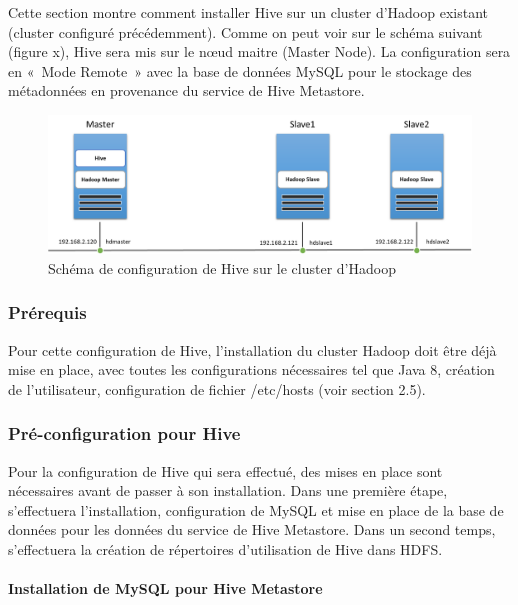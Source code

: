 \documentclass[12pt,french]{book}
\begin{document}
Cette section montre comment installer Hive sur un cluster d’Hadoop existant (cluster configuré précédemment). Comme on peut voir sur le schéma suivant (figure x), Hive sera mis sur le nœud maitre (Master Node). La configuration sera en « Mode Remote » avec la base de données MySQL pour le stockage des métadonnées en provenance du service de Hive Metastore.

\begin{figure}[H]
	\centering
	\includegraphics[width=\linewidth]{hiveCluster}
	\caption{Schéma de configuration de Hive sur le cluster d'Hadoop}
\end{figure}

\subsubsection{Prérequis}

Pour cette configuration de Hive, l’installation du cluster Hadoop doit être déjà mise en place, avec toutes les configurations nécessaires tel que Java 8, création de l’utilisateur, configuration de fichier /etc/hosts (voir section 2.5).

\subsubsection{Pré-configuration pour Hive}

Pour la configuration de Hive qui sera effectué, des mises en place sont nécessaires avant de passer à son installation.
Dans une première étape, s’effectuera l’installation, configuration de MySQL et mise en place de la base de données pour les données du service de Hive Metastore.
Dans un second temps, s’effectuera la création de répertoires d’utilisation de Hive dans HDFS.

\paragraph{Installation de MySQL pour Hive Metastore}\mbox{}\\
\end{document}

